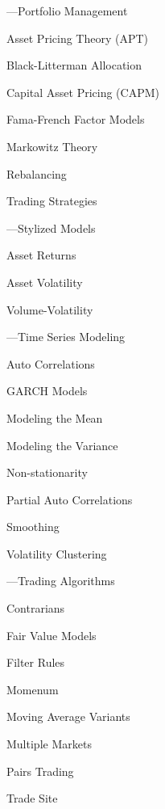 \begin{minipage}{0.40\textwidth}
\noindent ---Portfolio Management 
	\begin{flushright}
	Asset Pricing Theory (APT) \par
	Black-Litterman Allocation \par 
	Capital Asset Pricing (CAPM) \par
	Fama-French Factor Models \par
	Markowitz Theory \par
	Rebalancing \par
	Trading Strategies 
	\end{flushright}


\noindent ---Stylized Models
	\begin{flushright}
	Asset Returns \par
	Asset Volatility \par
	Volume-Volatility 
	\end{flushright}
	

\noindent ---Time Series Modeling
	\begin{flushright}
	Auto Correlations \par
	GARCH Models \par
	Modeling the Mean \par
	Modeling the Variance \par
	Non-stationarity \par
	Partial Auto Correlations \par
	Smoothing \par
	Volatility Clustering 
	\end{flushright}


\noindent ---Trading Algorithms
	\begin{flushright}
	Contrarians \par
	Fair Value Models \par
	Filter Rules \par
	Momenum \par
	Moving Average Variants \par
	Multiple Markets \par
	Pairs Trading \par
	Trade Site 
	\end{flushright}
\end{minipage}











	

